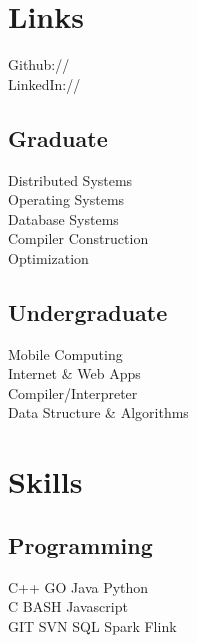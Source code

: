 \documentclass[]{deedy-resume-openfont}
\begin{document}
\begin{minipage}[t]{0.33\textwidth}
\section{Links} 
Github:// \href{https://github.com/sh-ankur/}{} \\
LinkedIn://  \href{https://www.linkedin.com/in/ankursh92}{} \\
\sectionsep


\subsection{Graduate}
Distributed Systems \\
Operating Systems \\
Database Systems\\
Compiler Construction \\
Optimization \\
\sectionsep

\subsection{Undergraduate}
Mobile Computing \\
Internet \& Web Apps \\
Compiler/Interpreter\\
Data Structure \& Algorithms\\
\sectionsep


\section{Skills}
\subsection{Programming}
C++ \textbullet{}   GO \textbullet{} Java \textbullet{} Python \\
C \textbullet{} BASH \textbullet{} Javascript \\
GIT \textbullet{} SVN \textbullet{} SQL \textbullet{} Spark  \textbullet{} Flink
\sectionsep



\end{minipage}
\end{document}
